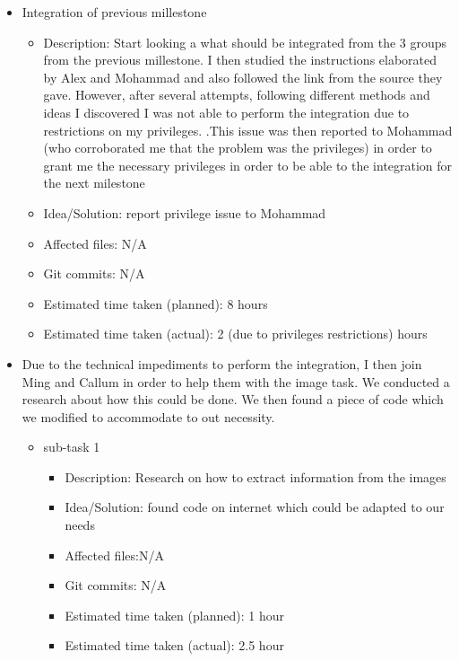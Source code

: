 \documentclass{article}
\begin{document}
\begin{itemize}
\begin{itemize}
	     \end{itemize}
	\item Integration of previous millestone
	     \begin{itemize}
	        \item Description: Start looking a what should be integrated from the 3 groups from the previous millestone.  I then studied the instructions elaborated by Alex and Mohammad and also followed the link from the source they gave.  However, after several attempts, following different methods and ideas I discovered I was not able to perform the integration due to restrictions on my privileges. .This issue was then reported to Mohammad  (who corroborated me that the problem was the privileges) in order to grant me the necessary privileges in order to be able to the integration for the next milestone
		\item Idea/Solution: report privilege issue to Mohammad
		\item Affected files: N/A
		\item Git commits: N/A
		\item Estimated time taken (planned): 8 hours
		\item Estimated time taken (actual): 2 (due to privileges restrictions) hours
	      \end{itemize}
	\item Due to the technical impediments to perform the integration, I then join Ming and Callum in order to help them with the image task.   We conducted a research about how this could be done.  We then found a piece of code which we modified to accommodate to out necessity.
            \begin{itemize}
                \item sub-task 1
                \begin{itemize}
                    \item Description: Research on how to extract information from the images
                    \item Idea/Solution: found code on internet which could be adapted to our needs
                    \item Affected files:N/A
                    \item Git commits: N/A
                    \item Estimated time taken (planned): 1 hour
                    \item Estimated time taken (actual): 2.5 hour
                \end{itemize}

\end{itemize}
\end{itemize}
\end{document}
